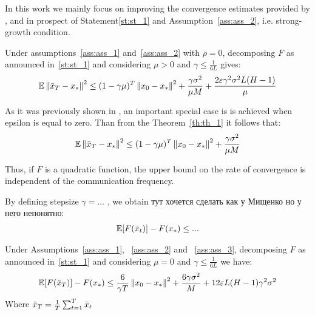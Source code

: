 In this work we mainly focus on improving the convergence estimates provided by \cite{Woodworth}, \cite{Khaled} and \cite{Spiridonoff} in prospect of Statement\ref{st:st_1} and Assumption~\ref{ass:ass_2}, i.e. strong-growth condition.

\begin{theorem} \label{th:th_1}
    Under assumptions~\ref{ass:ass_1} and~\ref{ass:ass_2} with $\rho = 0$, decomposing $F$ as announced in~\ref{st:st_1} and considering $\mu > 0$ and $\gamma \leq \frac{1}{6 L}$ gives:
    \begin{align}
        \E \norm{\bar{x}_T - x_*}^2
        \leq
        (1 - \gamma \mu)^T \norm{x_0 - x_*}^2 
        + \frac{\gamma \sigma^2}{\mu M} 
        + \frac{2 \varepsilon \gamma^2 \sigma^2 L (H-1)}{\mu}
    \end{align}
\end{theorem}

\begin{corollary} \label{}
    As it was previously shown in \cite{Woodworth}, an important special case is is achieved when epsilon is equal to zero. Than from the Theorem~\ref{th:th_1} it follows that:
    \begin{align}
        \E \norm{\bar{x}_T - x_*}^2
        \leq
        (1 - \gamma \mu)^T \norm{x_0 - x_*}^2 
        + \frac{\gamma \sigma^2}{\mu M}
    \end{align}
\end{corollary}

Thus, if $F$ is a quadratic function, the upper bound on the rate of convergence is independent of the communication frequency.

\begin{corollary} \label{}
    By defining stepsize $\gamma = ...$ \cite{...}, we obtain тут хочется сделать как у Мищенко но у него непонятно:
    \begin{align}
        \E[F(\bar{x}_t)] - F(x_*)
        \leq
        ...
    \end{align}
\end{corollary}



\begin{theorem} \label{th:th_2}
    Under Assumptions~\ref{ass:ass_1}, ~\ref{ass:ass_2} and ~\ref{ass:ass_3}, decomposing $F$ as announced in~\ref{st:st_1} and considering $\mu = 0$ and $\gamma \leq \frac{1}{6 L}$ we have:
    \begin{align}
        \E [F(\hat{x}_T)] - F(x_*)
        \leq \frac{6}{ \gamma T} \norm{x_0 - x_*}^2
        + \frac{6 \gamma \sigma^2}{M}
        + 12 \varepsilon L (H-1) \gamma^2 \sigma^2
    \end{align}
    Where $\hat{x}_T = \frac{1}{T} \summ{t=1}{T} \bar{x}_t$
\end{theorem}

